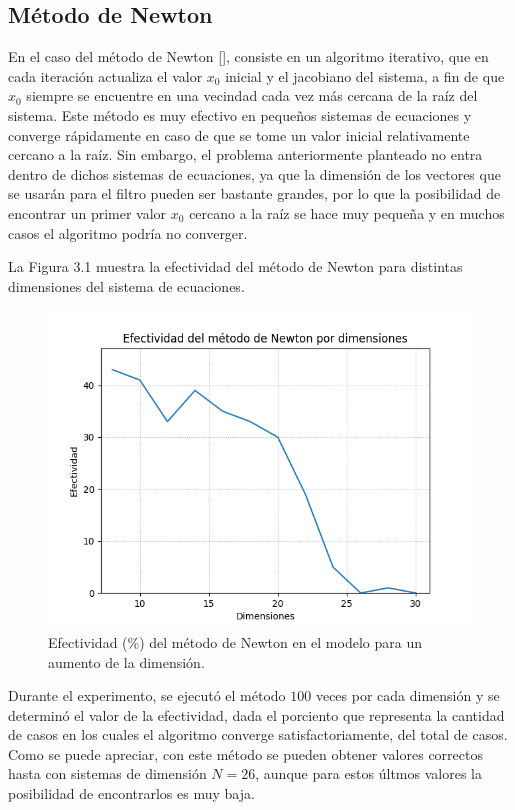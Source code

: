 \subsection{M\'etodo de Newton}

\par En el caso del m\'etodo de Newton [\cite{23}], consiste en un algoritmo iterativo, que en cada iteraci\'on actualiza el valor $x_0$ inicial y el jacobiano del sistema, a fin de que $x_0$ siempre se encuentre en una vecindad cada vez m\'as cercana de la ra\'iz del sistema. Este m\'etodo es muy efectivo en peque\~nos sistemas de ecuaciones y converge r\'apidamente en caso de que se tome un valor inicial relativamente cercano a la ra\'iz. Sin embargo, el problema anteriormente planteado no entra dentro de dichos sistemas de ecuaciones, ya que la dimensi\'on de los vectores que se usar\'an para el filtro pueden ser bastante grandes, por lo que la posibilidad de encontrar un primer valor $x_0$ cercano a la ra\'iz se hace muy peque\~na y en muchos casos el algoritmo podr\'ia no converger.\\

\par La Figura 3.1 muestra la efectividad del m\'etodo de Newton para distintas dimensiones del sistema de ecuaciones.

\begin{figure}[h]
\center
\includegraphics[scale=.45]{Graphics/Newton.png}
\caption{Efectividad (\%) del m\'etodo de Newton en el modelo para un aumento de la dimensi\'on.}
\end{figure}

\par Durante el experimento, se ejecut\'o el m\'etodo $100$ veces por cada dimensi\'on y se determin\'o el valor de la efectividad, dada el porciento que representa la cantidad de casos en los cuales el algoritmo converge satisfactoriamente, del total de casos. Como se puede apreciar, con este m\'etodo se pueden obtener valores correctos hasta con sistemas de dimensi\'on $N=26$, aunque para estos \'ultmos valores la posibilidad de encontrarlos es muy baja.

